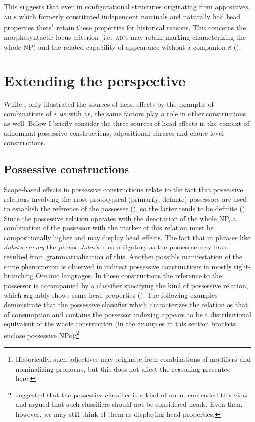 \documentclass[output=paper,nobabel,draftmode  ,colorlinks, citecolor=brown]{langscibook}
\begin{document}
\noindent
This  suggests that even in configurational structures originating from appositives, \textsc{adj}s  which formerly constituted independent nominals and naturally had head properties there\footnote{Historically, such adjectives may originate from combinations of modifiers and nominalizing pronouns, but this does not affect the reasoning presented here.} retain these properties for historical reasons. This concerns the morphosyntactic locus criterion (i.e.\ \textsc{adj}s may retain marking characterizing the whole NP) and the related capability of appearance without a companion \textsc{n} (\cite{Lander2010}).

\section{Extending the perspective}\label{sec-extending}
While I only illustrated the sources of head effects by the examples of combinations of
\textsc{adj}s with \textsc{n}s, the same factors play a role in other constructions as well. Below I
briefly consider the three sources of head effects in the context of adnominal possessive
constructions, adpositional phrases and clause level constructions. 

\subsection{Possessive constructions}\label{subsec-possessive}

\largerpage
Scope-based effects in possessive constructions relate to the fact that possessive relations involving the most prototypical (primarily, definite) possessors are used to establish the reference of the possessee (\cite{Keenan1974}), so the latter tends to be definite (\cite{Haspelmath1999}).
Since the possessive relation operates with the denotation of the whole NP, a combination of the
possessor with the marker of this relation must be compositionally higher and may display head
effects. The fact that in phrases like \emph{John's enemy} the phrase \emph{John's} is as obligatory
as the possessee may have resulted from grammaticalization of this. Another possible manifestation
of the same phenomenon is observed in indirect possessive constructions in mostly right-branching
Oceanic languages. In these constructions the reference to the possessor is accompanied by a
classifier specifying the kind of possessive relation, which arguably shows some head properties
(\cite{PalmerBrown2007}). The following examples demonstrate that the possessive classifier which
characterizes the relation as that of consumption and contains the possessor indexing appears to be
a distributional equivalent of the whole construction (in the examples in this section brackets
enclose possessive NPs):\footnote{\citet{PalmerBrown2007} suggested that the possessive classifier
  is a kind of noun. \citet{Lichtenberk2009} contended this view and argued that such classifiers
  should not be considered heads. Even then, however, we may still think of them as displaying head
  properties.} 
\end{document}
